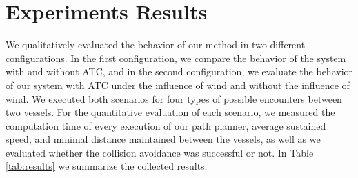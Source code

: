     
    \section{Experiments Results}
    
        
        We qualitatively evaluated the behavior of our method in two different configurations. In the first configuration, we compare the behavior of the system with and without ATC, and in the second configuration, we evaluate the behavior of our system with ATC under the influence of wind and without the influence of wind. We executed both scenarios for four types of possible encounters between two vessels. For the quantitative evaluation of each scenario, we measured the computation time of every execution of our path planner, average sustained speed, and minimal distance maintained between the vessels, as well as we evaluated whether the collision avoidance was successful or not. In Table \ref{tab:results} we summarize the collected results.
        
